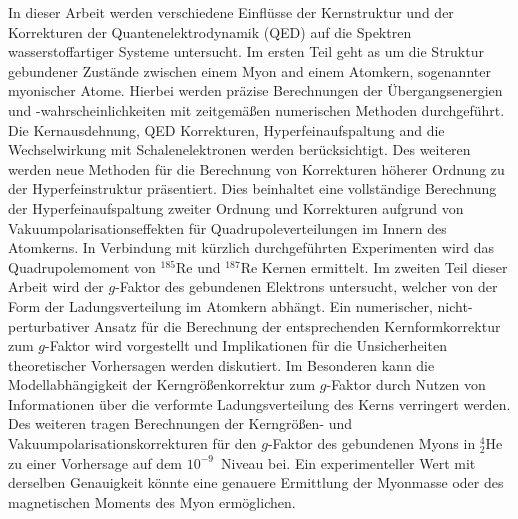 
{\small
In dieser Arbeit werden verschiedene Einflüsse der Kernstruktur und der Korrekturen der Quantenelektrodynamik (QED) auf die Spektren wasserstoffartiger Systeme untersucht.
Im ersten Teil geht as um die Struktur gebundener Zustände zwischen einem Myon and einem Atomkern, sogenannter myonischer Atome.
Hierbei werden präzise Berechnungen der Übergangsenergien und -wahrscheinlichkeiten mit zeitgemäßen numerischen Methoden durchgeführt. Die Kernausdehnung, QED Korrekturen, Hyperfeinaufspaltung and die Wechselwirkung mit Schalenelektronen werden berücksichtigt. Des weiteren werden neue Methoden für die Berechnung von Korrekturen höherer Ordnung zu der Hyperfeinstruktur präsentiert. Dies beinhaltet eine vollständige Berechnung der Hyperfeinaufspaltung zweiter Ordnung und Korrekturen aufgrund von Vakuumpolarisationseffekten für Quadrupoleverteilungen im Innern des Atomkerns. 
In Verbindung mit kürzlich durchgeführten Experimenten wird das Quadrupolemoment von $^{185}$Re und $^{187}$Re Kernen ermittelt.
Im zweiten Teil dieser Arbeit wird der $g$-Faktor des gebundenen Elektrons untersucht, welcher von der Form der Ladungsverteilung im Atomkern abhängt. Ein numerischer, nicht-perturbativer Ansatz für die Berechnung der entsprechenden Kernformkorrektur zum $g$-Faktor wird vorgestellt und Implikationen für die Unsicherheiten theoretischer Vorhersagen werden diskutiert. Im Besonderen kann die Modellabhängigkeit der Kerngrößenkorrektur zum $g$-Faktor durch Nutzen von Informationen über die verformte Ladungsverteilung des Kerns verringert werden.
Des weiteren tragen Berechnungen der Kerngrößen- und Vakuumpolarisationskorrekturen für den $g$-Faktor des gebundenen Myons in $^{4}_2$He zu einer Vorhersage auf dem $10^{-9}$~Niveau bei. Ein experimenteller Wert mit derselben Genauigkeit könnte eine genauere Ermittlung der Myonmasse oder des magnetischen Moments des Myon ermöglichen.
}
